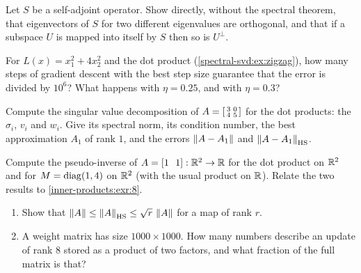 \begin{notechapter}
\begin{exercise}\label{spectral-svd:exr:3}
Let $S$ be a self-adjoint operator. Show directly, without the spectral
theorem, that eigenvectors of $S$ for two different eigenvalues are
orthogonal, and that if a subspace $U$ is mapped into itself by $S$ then
so is $U^\perp$.
\end{exercise}

\begin{exercise}\label{spectral-svd:exr:4}
For $L(x) = x_1^2 + 4x_2^2$ and the dot product
(\cref{spectral-svd:ex:zigzag}), how many steps of gradient descent with
the best step size guarantee that the error is divided by $10^6$? What
happens with $\eta = 0.25$, and with $\eta = 0.3$?
\end{exercise}

\begin{exercise}\label{spectral-svd:exr:5}
Compute the singular value decomposition of
$A = \begin{bsmallmatrix}3 & 0\\4 & 5\end{bsmallmatrix}$ for the dot
products: the $\sigma_i$, $v_i$ and $w_i$. Give its spectral norm, its
condition number, the best approximation $A_1$ of rank $1$, and the errors
$\left\|A - A_1\right\|$ and $\left\|A - A_1\right\|_{\mathrm{HS}}$.
\end{exercise}

\begin{exercise}\label{spectral-svd:exr:6}
Compute the pseudo-inverse of $A = [1\ \ 1]:\R^2\to\R$ for the dot product
on $\mathbb{R}^2$ and for $M = \operatorname{diag}(1, 4)$ on $\mathbb{R}^2$ (with the usual product on
$\mathbb{R}$). Relate the two results to \cref{inner-products:exr:8}.
\end{exercise}

\begin{exercise}\label{spectral-svd:exr:7}
\begin{enumerate}[nosep]
  \item Show that $\left\|A\right\|\leq\left\|A\right\|_{\mathrm{HS}}\leq\sqrt r\,\left\|A\right\|$
        for a map of rank $r$.
  \item A weight matrix has size $1000\times1000$. How many numbers
        describe an update of rank $8$ stored as a product of two
        factors, and what fraction of the full matrix is that?
\end{enumerate}
\end{exercise}


\end{notechapter}
